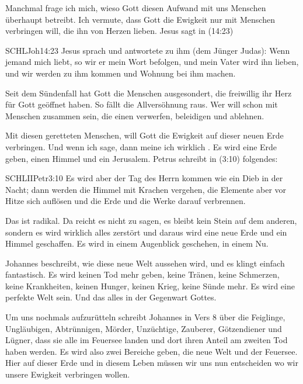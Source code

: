 \begin{otsblock}
        Manchmal frage ich mich, wieso Gott diesen Aufwand mit uns Menschen überhaupt betreibt. Ich vermute, dass Gott die Ewigkeit nur mit Menschen verbringen will, die ihn von Herzen lieben. Jesus sagt in (14:23)
        \begin{bibelbox}{SCHL}{Joh}{14:23}
            Jesus sprach und antwortete zu ihm (dem Jünger Judas): Wenn jemand mich liebt, so wir er mein Wort befolgen, und mein Vater wird ihn lieben, und wir werden zu ihm kommen und Wohnung bei ihm machen.
        \end{bibelbox}        
        Seit dem Sündenfall hat Gott die Menschen ausgesondert, die freiwillig ihr Herz für Gott geöffnet haben. So fällt die Allversöhnung raus. Wer will schon mit Menschen zusammen sein, die einen verwerfen, beleidigen und ablehnen.

        Mit diesen geretteten Menschen, will Gott die Ewigkeit auf dieser neuen Erde verbringen. Und wenn ich  sage, dann meine ich wirklich . Es wird eine  Erde geben, einen  Himmel und ein  Jerusalem. Petrus schreibt in (3:10) folgendes:
        \begin{bibelbox}{SCHL}{IIPetr}{3:10}
           Es wird aber der Tag des Herrn kommen wie ein Dieb in der Nacht; dann werden die Himmel mit Krachen vergehen, die Elemente aber vor Hitze sich auflösen und die Erde und die Werke darauf verbrennen.
        \end{bibelbox}
        Das ist radikal. Da reicht es nicht zu sagen, es bleibt kein Stein auf dem anderen, sondern es wird wirklich alles zerstört und daraus wird eine neue Erde und ein Himmel geschaffen. Es wird in einem Augenblick geschehen, in einem Nu. 

        Johannes beschreibt, wie diese neue Welt aussehen wird, und es klingt einfach fantastisch. Es wird keinen Tod mehr geben, keine Tränen, keine Schmerzen, keine Krankheiten, keinen Hunger, keinen Krieg, keine Sünde mehr. Es wird eine perfekte Welt sein. Und das alles in der Gegenwart Gottes. 

        Um uns nochmals aufzurütteln schreibt Johannes in Vers 8 über die Feiglinge, Ungläubigen, Abtrünnigen, Mörder, Unzüchtige, Zauberer, Götzendiener und Lügner, dass sie alle im Feuersee landen und dort ihren Anteil am zweiten Tod haben werden. Es wird also zwei Bereiche geben, die neue Welt und der Feuersee. Hier auf dieser Erde und in diesem Leben müssen wir uns nun entscheiden wo wir unsere Ewigkeit verbringen wollen.


\end{otsblock}
